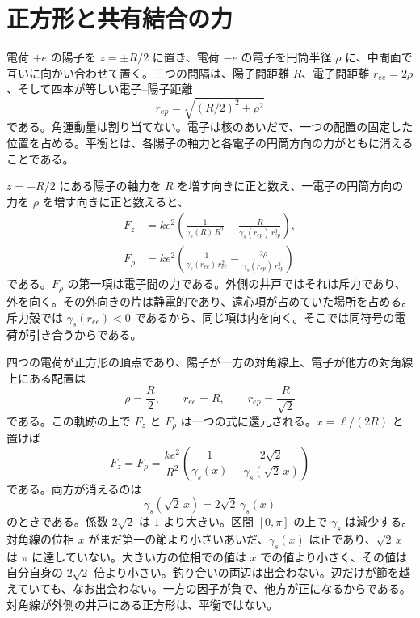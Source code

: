 \documentclass[a4paper]{article}
\begin{document}
\section{正方形と共有結合の力}
\label{sec:covalent}

電荷 \(+e\) の陽子を \(z=\pm R/2\) に置き、電荷 \(-e\) の電子を円筒半径 \(\rho\) に、中間面で互いに向かい合わせて置く。三つの間隔は、陽子間距離 \(R\)、電子間距離 \(r_{ee}=2\rho\)、そして四本が等しい電子--陽子距離
\[
r_{ep}=\sqrt{(R/2)^{2}+\rho^{2}}
\]
である。角運動量は割り当てない。電子は核のあいだで、一つの配置の固定した位置を占める。平衡とは、各陽子の軸力と各電子の円筒方向の力がともに消えることである。

\(z=+R/2\) にある陽子の軸力を \(R\) を増す向きに正と数え、一電子の円筒方向の力を \(\rho\) を増す向きに正と数えると、
\begin{align}
F_z
  &=k e^{2}\left(
    \frac{1}{\gamma_s(R)\,R^{2}}
    -\frac{R}{\gamma_s(r_{ep})\,r_{ep}^{3}}
  \right),
\label{eq:Faxial}\\
F_{\rho}
  &=k e^{2}\left(
    \frac{1}{\gamma_s(r_{ee})\,r_{ee}^{2}}
    -\frac{2\rho}{\gamma_s(r_{ep})\,r_{ep}^{3}}
  \right)
\label{eq:Frho}
\end{align}
である。\(F_{\rho}\) の第一項は電子間の力である。外側の井戸ではそれは斥力であり、外を向く。その外向きの片は静電的であり、遠心項が占めていた場所を占める。斥力殻では \(\gamma_s(r_{ee})<0\) であるから、同じ項は内を向く。そこでは同符号の電荷が引き合うからである。

四つの電荷が正方形の頂点であり、陽子が一方の対角線上、電子が他方の対角線上にある配置は
\begin{equation}
\label{eq:square}
\rho=\frac{R}{2},
\qquad
r_{ee}=R,
\qquad
r_{ep}=\frac{R}{\sqrt{2}}
\end{equation}
である。この軌跡の上で \(F_z\) と \(F_{\rho}\) は一つの式に還元される。\(x=\ell/(2R)\) と置けば
\begin{equation}
\label{eq:squareF}
F_z=F_{\rho}
  =\frac{k e^{2}}{R^{2}}
  \left(
    \frac{1}{\gamma_s(x)}
    -\frac{2\sqrt{2}}{\gamma_s(\sqrt{2}\,x)}
  \right)
\end{equation}
である。両方が消えるのは
\begin{equation}
\label{eq:squarecond}
\gamma_s(\sqrt{2}\,x)=2\sqrt{2}\,\gamma_s(x)
\end{equation}
のときである。係数 \(2\sqrt{2}\) は \(1\) より大きい。区間 \([0,\pi]\) の上で \(\gamma_s\) は減少する。対角線の位相 \(x\) がまだ第一の節より小さいあいだ、\(\gamma_s(x)\) は正であり、\(\sqrt{2}\,x\) は \(\pi\) に達していない。大きい方の位相での値は \(x\) での値より小さく、その値は自分自身の \(2\sqrt{2}\) 倍より小さい。釣り合いの両辺は出会わない。辺だけが節を越えていても、なお出会わない。一方の因子が負で、他方が正になるからである。対角線が外側の井戸にある正方形は、平衡ではない。
\end{document}
